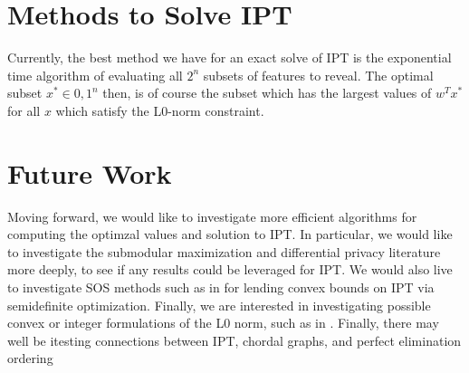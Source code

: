 \documentclass[12pt]{article}
\begin{document}
\section{Methods to Solve \gls{IPT}}
Currently, the best method we have for an exact solve of \gls{IPT} is the exponential time algorithm of evaluating all $2^n$ subsets of features to reveal. The optimal subset $x^* \in {0,1}^n$ then, is of course the subset which has the largest values of $w^Tx^*$ for all $x$ which satisfy the L0-norm constraint.
\section*{Future Work}
 Moving forward, we would like to investigate more efficient algorithms for computing the optimzal values and solution to \gls{IPT}. In particular, we would like to investigate the submodular maximization and differential privacy literature more deeply, to see if any results could be leveraged for \gls{IPT}. We would also live to investigate SOS methods such as in \cite{AAADibek} for lending convex bounds on \gls{IPT} via semidefinite optimization. Finally, we are interested in investigating possible convex or integer formulations of the L0 norm, such as in \cite{Alper} \cite{feng2013complementarity}. Finally, there may well be itesting connections between \gls{IPT}, chordal graphs, and perfect elimination ordering \cite{blair1993introduction}



\newpage

\end{document}
